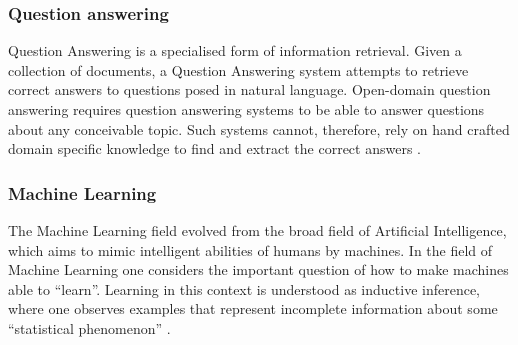 \subsubsection{Question answering}
Question Answering is a specialised form of information retrieval. Given a collection of documents, a Question Answering system attempts to retrieve correct answers to questions posed in natural language. Open-domain question answering requires question answering systems to be able to answer questions about any conceivable topic. Such systems cannot, therefore, rely on hand crafted domain specific knowledge to find and extract the correct answers \cite{Lampert:2004}.

\subsubsection{Machine Learning}
The Machine Learning field evolved from the broad field of Artificial Intelligence, which aims to mimic intelligent abilities of humans by machines. In the field of Machine Learning one considers the important question of how to make machines able to \enquote{learn}. Learning in this context is understood as inductive inference, where one observes examples that represent incomplete information about some \enquote{statistical phenomenon} \cite{Raetsch:2004}.
